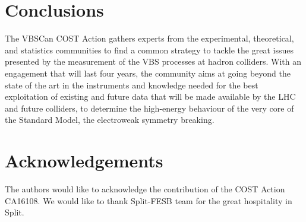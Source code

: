 \documentclass[12pt]{article}
\begin{document}


\section*{Conclusions}

The VBSCan COST Action
gathers experts from the experimental, theoretical, and statistics communities
to find a common strategy to tackle the great issues presented
by the measurement of the VBS processes at hadron colliders.
With an engagement that will last four years,
the community aims at going beyond the state of the art
in the instruments and knowledge needed for the best exploitation
of existing and future data 
that will be made available by the LHC and future colliders,
to determine the high-energy behaviour of the very core of the Standard Model,
the electroweak symmetry breaking.

\section*{Acknowledgements}

The authors would like to acknowledge the contribution of the COST Action CA16108. We
would like to thank Split-FESB team for the great hospitality in Split.

%
% 

\printbibliography
\end{document}
